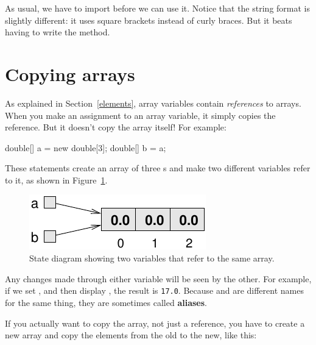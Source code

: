 \begin{stdout}
[1, 2, 3, 4]
\end{stdout}

As usual, we have to import  before we can use it.
Notice that the string format is slightly different: it uses square brackets instead of curly braces.
But it beats having to write the  method.


\section{Copying arrays}
\label{copyarray}


As explained in Section~\ref{elements}, array variables contain {\em references} to arrays.
When you make an assignment to an array variable, it simply copies the reference.
But it doesn't copy the array itself!
For example:

\begin{code}
double[] a = new double[3];
double[] b = a;
\end{code}

These statements create an array of three s and make two different variables refer to it, as shown in Figure~\ref{fig.array3}.

\begin{figure}[!ht]
\begin{center}
\includegraphics{figs/array3.pdf}
\caption{State diagram showing two variables that refer to the same array.}
\label{fig.array3}
\end{center}
\end{figure}


Any changes made through either variable will be seen by the other.
For example, if we set , and then display , the result is {\tt 17.0}.
Because  and  are different names for the same thing, they are sometimes called {\bf aliases}.

If you actually want to copy the array, not just a reference, you have to create a new array and copy the elements from the old to the new, like this:

